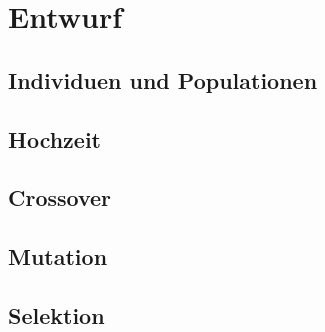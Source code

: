 
\section{Entwurf}

\subsection{Individuen und Populationen}

\subsection{Hochzeit}

\subsection{Crossover}

\subsection{Mutation}

\subsection{Selektion}



